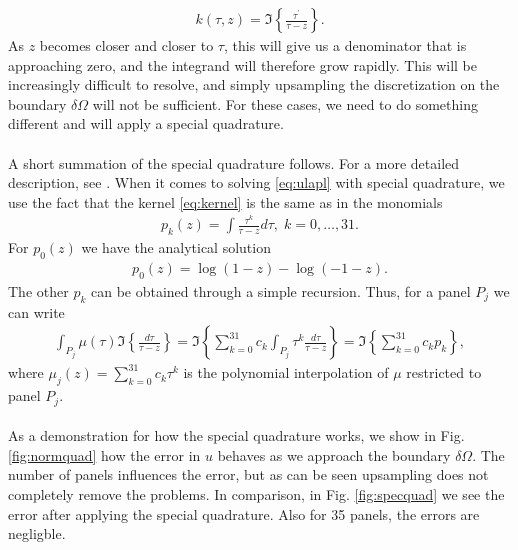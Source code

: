 \documentclass[a4paper,10pt]{article}
\begin{document}
\begin{align}
k(\tau,z) = \Im\left\{ \frac{\tau^\prime}{\tau-z}\right\}.
\label{eq:kernel}
\end{align}
As $z$ becomes closer and closer to $\tau$, this will give us a denominator that is approaching zero, and the integrand will therefore grow rapidly. This will be increasingly difficult to resolve, and simply upsampling the discretization on the boundary $\delta\Omega$ will not be sufficient. For these cases, we need to do something different and will apply a special quadrature.
\\ \\
A short summation of the special quadrature follows. For a more detailed description, see \cite{ojalahelsing}. When it comes to solving \eqref{eq:ulapl} with special quadrature, we use the fact that the kernel \eqref{eq:kernel} is the same as in the monomials 
\begin{align}
    p_k(z) = \int \frac{\tau^k}{\tau-z}d\tau, \; k=0,\hdots,31.
    \label{eq:pkrec}
\end{align}
For $p_0(z)$ we have the analytical solution 
\begin{align}
    p_0(z) = \log(1-z)-\log(-1-z).
    \label{eq:p0}  
\end{align}
The other $p_k$ can be obtained through a simple recursion. Thus, for a panel $P_j$ we can write
\begin{align}
    \int_{P_j} \mu(\tau) \Im\left\{ \frac{d\tau}{\tau-z} \right\} = \Im\left\{ \sum_{k=0}^{31} c_k \int_{P_j} \tau^k\frac{d\tau}{\tau-z} \right\} = \Im\left\{ \sum_{k=0}^{31} c_kp_k \right\},
    \label{eq:specQ}
\end{align}
where $\mu_j(z) = \sum_{k=0}^{31} c_k\tau^k$ is the polynomial interpolation of $\mu$ restricted to panel $P_j$. 
\\ \\
As a demonstration for how the special quadrature works, we show in Fig. \ref{fig:normquad} how the error in $u$ behaves as we approach the boundary $\delta\Omega$. The number of panels influences the error, but as can be seen upsampling does not completely remove the problems. In comparison, in Fig. \ref{fig:specquad} we see the error after applying the special quadrature. Also for 35 panels, the errors are negligble. 
\end{document}
